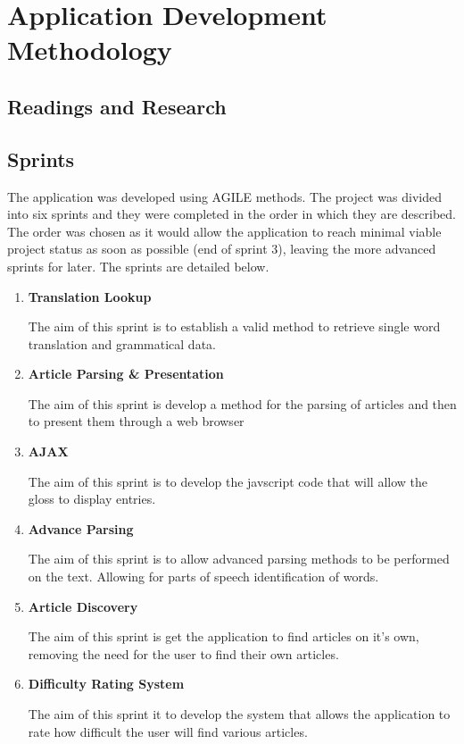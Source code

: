 \chapter{Application Development Methodology}

\section{Readings and Research}


\section{Sprints}

The application was developed using AGILE methods. The project was divided into six sprints and they were completed in the order in which they are described. The order was chosen as it would allow the application to reach minimal viable project status as soon as possible (end of sprint 3), leaving the more advanced sprints for later. The sprints are detailed below.

\begin{enumerate}
	\item \textbf{Translation Lookup}
	
	The aim of this sprint is to establish a valid method to retrieve single word translation and grammatical data.
	
	\item \textbf{Article Parsing \& Presentation}
	
	The aim of this sprint is develop a method for the parsing of articles and then to present them through a web browser
	
	\item \textbf{AJAX}
	
	The aim of this sprint is to develop the javscript code that will allow the gloss to display entries.
	
	\item \textbf{Advance Parsing}
	
	The aim of this sprint is to allow advanced parsing methods to be performed on the text. Allowing for parts of speech identification of words. 
	
	\item \textbf{Article Discovery}
	
	The aim of this sprint is get the application to find articles on it's own, removing the need for the user to find their own articles.
	
	\item \textbf{Difficulty Rating System}
	
	The aim of this sprint it to develop the system that allows the application to rate how difficult the user will find various articles. 
	
\end{enumerate}

